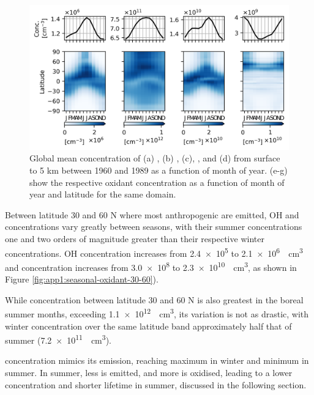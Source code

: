 \begin{figure}
    \centering
    \includegraphics{Chapter4/Figs/seasonal_oxidant_pothole.png}
    \caption[Mean concentration of , , , and  from surface to 5 km between 1960 and 1989]{Global mean concentration of (a) , (b) , (c), , and (d)  from surface to 5 km between 1960 and 1989 as a function of month of year. (e-g) show the respective oxidant concentration as a function of month of year and latitude for the same domain.}
    \label{fig:ch4:seasonal-oxidants}
\end{figure}

Between latitude 30 and 60 \textdegree N where most anthropogenic  are emitted, OH and  concentrations vary greatly between seasons, with their summer concentrations one and two orders of magnitude greater than their respective winter concentrations. OH concentration increases from \num{2.4e5} to \qty{2.1e6}{\per\cubic\cm} and  concentration increases from \num{3.0e8} to \qty{2.3e10}{\per\cubic\cm}, as shown in Figure \ref{fig:app1:seasonal-oxidant-30-60}). 

While  concentration between latitude 30 and 60 \textdegree N is also greatest in the boreal summer months, exceeding \qty{1.1e12}{\per\cubic\cm}, its variation is not as drastic, with winter concentration over the same latitude band approximately half that of summer (\qty{7.2e11}{\per\cubic\cm}).

 concentration mimics its emission, reaching maximum in winter and minimum in summer. In summer, less  is emitted, and more is oxidised, leading to a lower concentration and shorter lifetime in summer, discussed in the following section.

